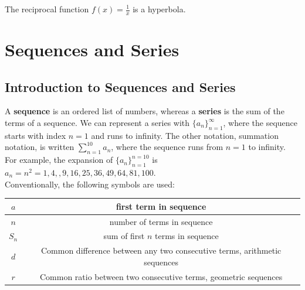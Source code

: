 \documentclass{article}
\begin{document}
    \noindent The reciprocal function $f(x)=\frac{1}{x}$ is a hyperbola.

    \pagebreak


    \section{Sequences and Series}

    \subsection{Introduction to Sequences and Series}
    A \textbf{sequence} is an ordered list of numbers, whereas a \textbf{series} is the
    sum of the terms of a sequence. We can represent a series with $\{a_n\}^\infty_{n=1}$,
    where the sequence starts with index $n=1$ and runs to infinity. The other notation,
    summation notation, is written $\sum^{10}_{n=1}a_n$, where the sequence runs from $n=1$
    to infinity. \\

    \noindent For example, the expansion of
    $\{a_n\}_{n=1}^{n=10}$ is $a_n=n^2=1,4,,9,16,25,36,49,64,81,100$. \\

    \noindent Conventionally, the following symbols are used:

    \begin{center}
        \begin{tabular} {|c|c|}
            \hline
            $a$
            & first term in sequence                                                    \\
            \hline
            $n$
            & number of terms in sequence                                               \\
            \hline
            $S_n$
            & sum of first $n$ terms in sequence                                        \\
            \hline
            $d$
            & Common difference between any two consecutive terms, arithmetic sequences \\
            \hline
            $r$
            & Common ratio between two consecutive terms, geometric sequences           \\
            \hline
        \end{tabular}
    \end{center}
\end{document}
